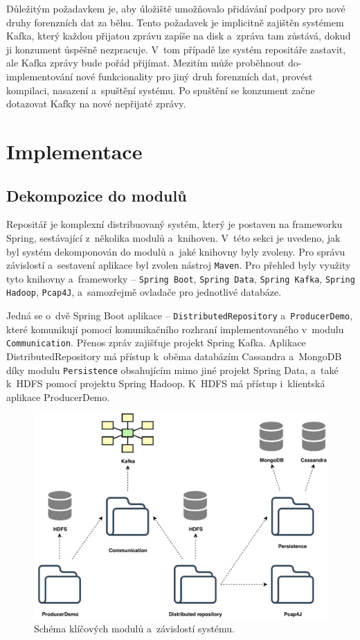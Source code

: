 Důležitým požadavkem je, aby úložiště umožňovalo přidávání podpory pro nové druhy forenzních dat za běhu. Tento požadavek je implicitně zajištěn systémem Kafka, který každou přijatou zprávu zapíše na disk a~zpráva tam zůstává, dokud ji konzument úspěšně nezpracuje. V~tom případě lze systém repositáře zastavit, ale Kafka zprávy bude pořád přijímat. Mezitím může proběhnout do-implementování nové funkcionality pro jiný druh forenzních dat, provést kompilaci, nasazení a~spuštění systému. Po spuštění se konzument začne dotazovat Kafky na nové nepřijaté zprávy.

\chapter{Implementace} \label{chapter_impl}

\section{Dekompozice do modulů}
Repositář je komplexní distribuovaný systém, který je postaven na frameworku Spring, sestávající z~několika modulů a~knihoven. V~této sekci je uvedeno, jak byl systém dekomponován do modulů a~jaké knihovny byly zvoleny. Pro správu závislostí a~sestavení aplikace byl zvolen nástroj \texttt{Maven}. Pro přehled byly využity tyto knihovny a~frameworky -- \texttt{Spring Boot}, \texttt{Spring Data}, \texttt{Spring Kafka}, \texttt{Spring Hadoop}, \texttt{Pcap4J}, a~samozřejmě ovladače pro jednotlivé databáze.

Jedná se o~dvě Spring Boot aplikace -- \texttt{DistributedRepository} a~\texttt{ProducerDemo}, které komunikují pomocí komunikačního rozhraní implementovaného v~modulu \texttt{Communication}. Přenos zpráv zajišťuje projekt Spring Kafka. Aplikace DistributedRepository má přístup k~oběma databázím Cassandra a~MongoDB díky modulu \texttt{Persistence} obsahujícím mimo jiné projekt Spring Data, a~také k~HDFS pomocí projektu Spring Hadoop. K~HDFS má přístup i~klientská aplikace ProducerDemo.

\begin{figure}[!h]
  \centering
  \includegraphics[width=12.3cm]{template-fig/Architecture.pdf}
  \caption{Schéma klíčových modulů a~závislostí systému.}
  \label{FIG_Architecture}
\end{figure}

